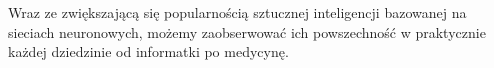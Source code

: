Wraz ze zwiększającą się popularnością sztucznej inteligencji bazowanej na sieciach neuronowych, możemy zaobserwować ich powszechność w praktycznie każdej dziedzinie od informatki po medycynę. 